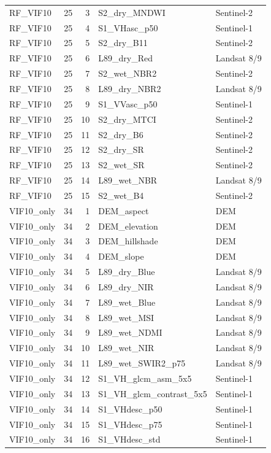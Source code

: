\begin{tabular}{lrrll}
RF_VIF10 & 25 & 3 & S2_dry_MNDWI & Sentinel-2 \\
RF_VIF10 & 25 & 4 & S1_VHasc_p50 & Sentinel-1 \\
RF_VIF10 & 25 & 5 & S2_dry_B11 & Sentinel-2 \\
RF_VIF10 & 25 & 6 & L89_dry_Red & Landsat 8/9 \\
RF_VIF10 & 25 & 7 & S2_wet_NBR2 & Sentinel-2 \\
RF_VIF10 & 25 & 8 & L89_dry_NBR2 & Landsat 8/9 \\
RF_VIF10 & 25 & 9 & S1_VVasc_p50 & Sentinel-1 \\
RF_VIF10 & 25 & 10 & S2_dry_MTCI & Sentinel-2 \\
RF_VIF10 & 25 & 11 & S2_dry_B6 & Sentinel-2 \\
RF_VIF10 & 25 & 12 & S2_dry_SR & Sentinel-2 \\
RF_VIF10 & 25 & 13 & S2_wet_SR & Sentinel-2 \\
RF_VIF10 & 25 & 14 & L89_wet_NBR & Landsat 8/9 \\
RF_VIF10 & 25 & 15 & S2_wet_B4 & Sentinel-2 \\
VIF10_only & 34 & 1 & DEM_aspect & DEM \\
VIF10_only & 34 & 2 & DEM_elevation & DEM \\
VIF10_only & 34 & 3 & DEM_hillshade & DEM \\
VIF10_only & 34 & 4 & DEM_slope & DEM \\
VIF10_only & 34 & 5 & L89_dry_Blue & Landsat 8/9 \\
VIF10_only & 34 & 6 & L89_dry_NIR & Landsat 8/9 \\
VIF10_only & 34 & 7 & L89_wet_Blue & Landsat 8/9 \\
VIF10_only & 34 & 8 & L89_wet_MSI & Landsat 8/9 \\
VIF10_only & 34 & 9 & L89_wet_NDMI & Landsat 8/9 \\
VIF10_only & 34 & 10 & L89_wet_NIR & Landsat 8/9 \\
VIF10_only & 34 & 11 & L89_wet_SWIR2_p75 & Landsat 8/9 \\
VIF10_only & 34 & 12 & S1_VH_glcm_asm_5x5 & Sentinel-1 \\
VIF10_only & 34 & 13 & S1_VH_glcm_contrast_5x5 & Sentinel-1 \\
VIF10_only & 34 & 14 & S1_VHdesc_p50 & Sentinel-1 \\
VIF10_only & 34 & 15 & S1_VHdesc_p75 & Sentinel-1 \\
VIF10_only & 34 & 16 & S1_VHdesc_std & Sentinel-1 \\

\end{tabular}
